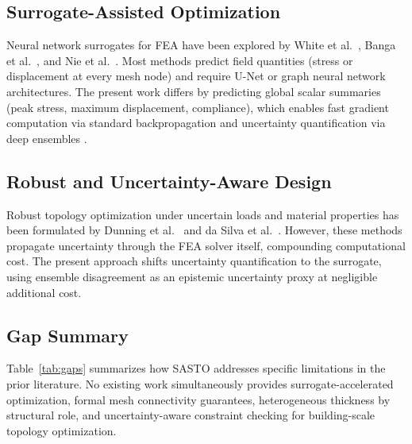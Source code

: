 \documentclass[11pt]{article}
\theoremstyle{plain}
\theoremstyle{definition}
\theoremstyle{remark}
\begin{document}
\subsection{Surrogate-Assisted Optimization}

Neural network surrogates for FEA have been explored by White et al.\ \cite{white2019}, Banga et al.\ \cite{banga2018}, and Nie et al.\ \cite{nie2021}. Most methods predict field quantities (stress or displacement at every mesh node) and require U-Net or graph neural network architectures. The present work differs by predicting global scalar summaries (peak stress, maximum displacement, compliance), which enables fast gradient computation via standard backpropagation and uncertainty quantification via deep ensembles \cite{lakshminarayanan2017}.

\subsection{Robust and Uncertainty-Aware Design}

Robust topology optimization under uncertain loads and material properties has been formulated by Dunning et al.\ \cite{dunning2011} and da Silva et al.\ \cite{dasilva2019}. However, these methods propagate uncertainty through the FEA solver itself, compounding computational cost. The present approach shifts uncertainty quantification to the surrogate, using ensemble disagreement as an epistemic uncertainty proxy at negligible additional cost.

\subsection{Gap Summary}

Table~\ref{tab:gaps} summarizes how SASTO addresses specific limitations in the prior literature. No existing work simultaneously provides surrogate-accelerated optimization, formal mesh connectivity guarantees, heterogeneous thickness by structural role, and uncertainty-aware constraint checking for building-scale topology optimization.
\end{document}
